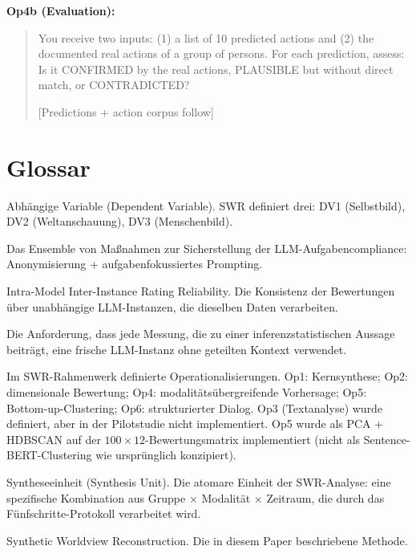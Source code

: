 \documentclass[11pt,a4paper]{article}
\begin{document}
\textbf{Op4b (Evaluation):}
\begin{quote}
\small\ttfamily
You receive two inputs: (1) a list of 10 predicted actions and (2) the documented real actions of a group of persons. For each prediction, assess: Is it CONFIRMED by the real actions, PLAUSIBLE but without direct match, or CONTRADICTED?

[Predictions + action corpus follow]
\end{quote}


\section{Glossar}
\label{app:glossary}

\begin{description}[style=nextline, leftmargin=2cm]
  \item[DV] Abh\"angige Variable (Dependent Variable). SWR definiert drei: DV1 (Selbstbild), DV2 (Weltanschauung), DV3 (Menschenbild).
  \item[Focus Control] Das Ensemble von Ma\ss{}nahmen zur Sicherstellung der LLM-Aufgabencompliance: Anonymisierung + aufgabenfokussiertes Prompting.
  \item[IMIIRR] Intra-Model Inter-Instance Rating Reliability. Die Konsistenz der Bewertungen \"uber unabh\"angige LLM-Instanzen, die dieselben Daten verarbeiten.
  \item[Instance Separation] Die Anforderung, dass jede Messung, die zu einer inferenzstatistischen Aussage beitr\"agt, eine frische LLM-Instanz ohne geteilten Kontext verwendet.
  \item[Op1--Op6] Im SWR-Rahmenwerk definierte Operationalisierungen. Op1: Kernsynthese; Op2: dimensionale Bewertung; Op4: modalit\"ats\"ubergreifende Vorhersage; Op5: Bottom-up-Clustering; Op6: strukturierter Dialog. Op3 (Textanalyse) wurde definiert, aber in der Pilotstudie nicht implementiert. Op5 wurde als PCA + HDBSCAN auf der $100 \times 12$-Bewertungsmatrix implementiert (nicht als Sentence-BERT-Clustering wie urspr\"unglich konzipiert).
  \item[SE] Syntheseeinheit (Synthesis Unit). Die atomare Einheit der SWR-Analyse: eine spezifische Kombination aus Gruppe $\times$ Modalit\"at $\times$ Zeitraum, die durch das F\"unfschritte-Protokoll verarbeitet wird.
  \item[SWR] Synthetic Worldview Reconstruction. Die in diesem Paper beschriebene Methode.
\end{description}
\end{document}
